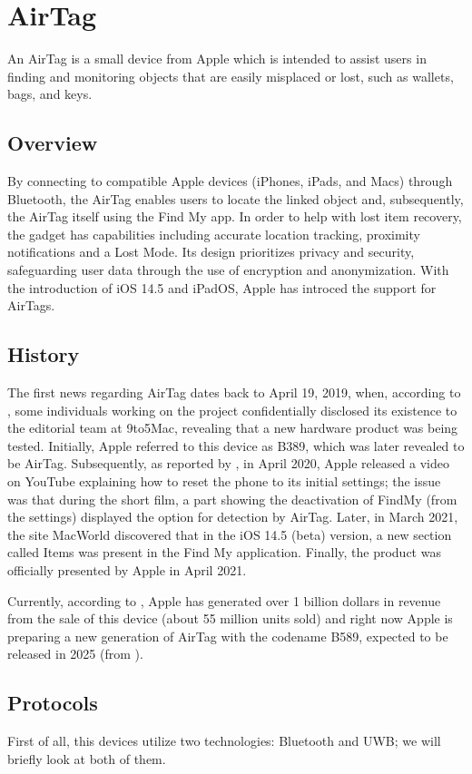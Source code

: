 \documentclass[english]{article}
\begin{document}
\section{AirTag}\label{sec:at}
An AirTag is a small device from Apple which is intended to assist users in finding and monitoring objects that are easily misplaced or lost, such as wallets, bags, and keys.
\subsection{Overview}
 By connecting to compatible Apple devices (iPhones, iPads, and Macs) through Bluetooth, the AirTag enables users to locate the linked object and, subsequently, the AirTag itself using the Find My app. In order to help with lost item recovery, the gadget has capabilities including accurate location tracking, proximity notifications and a Lost Mode. Its design prioritizes privacy and security, safeguarding user data through the use of encryption and anonymization. With the introduction of iOS 14.5 and iPadOS, Apple has introced the support for AirTags.
\subsection{History}
The first news regarding AirTag dates back to April 19, 2019, when, according to \cite{Rambo_2019}, some individuals working on the project confidentially disclosed its existence to the editorial team at 9to5Mac, revealing that a new hardware product was being tested. Initially, Apple referred to this device as B389, which was later revealed to be AirTag. Subsequently, as reported by \cite{TechCrunch}, in April 2020, Apple released a video on YouTube explaining how to reset the phone to its initial settings; the issue was that during the short film, a part showing the deactivation of FindMy (from the settings) displayed the option for detection by AirTag. Later, in March 2021, the site MacWorld \cite{Macworld} discovered that in the iOS 14.5 (beta) version, a new section called Items was present in the Find My application. Finally, the product was officially presented by Apple in April 2021. 

Currently, according to \cite{Kumar_2023}, Apple has generated over 1 billion dollars in revenue from the sale of this device (about 55 million units sold) and right now Apple is preparing a new generation of AirTag with the codename B589, expected to be released in 2025 (from \cite{Bloomberg}).

\subsection{Protocols}
First of all, this devices utilize two technologies: Bluetooth and UWB; we will briefly look at both of them.
\end{document}
